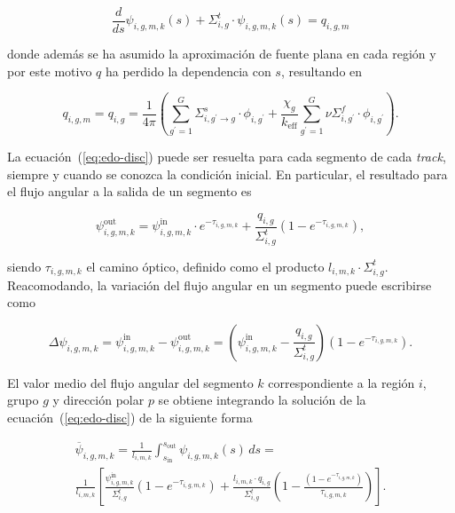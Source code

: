 \documentclass[11pt]{article}
\begin{document}
\begin{equation} \label{eq:edo-disc}
 \frac{d}{ds}\psi_{i,g,m,k} (s)
 + \Sigma^t_{i,g} \cdot \psi_{i,g,m,k} (s) = 
 q_{i,g,m}
\end{equation}

\noindent
donde además se ha asumido la aproximación de fuente plana en cada región y por este motivo $q$ ha perdido la dependencia con $s$, resultando en

\begin{equation} \label{eq:fuente-isotropica}
 q_{i,g,m} = q_{i,g} = 
 \frac{1}{4\pi} \left(
 \sum_{g^\prime=1}^G \Sigma^s_{i,g^\prime \rightarrow g} \cdot \phi_{i,g^\prime}
 + \frac{\chi_g}{k_{\text{eff}}} \sum_{g^\prime=1}^G \nu\Sigma^f_{i,g^\prime} \cdot \phi_{i,g^\prime}
 \right).
\end{equation}

La ecuación~(\ref{eq:edo-disc}) puede ser resuelta para cada segmento de cada \emph{track}, siempre y cuando se conozca la condici\'on inicial. En particular, el resultado para el flujo angular a la salida de un segmento es

\begin{equation}
 \psi^{\text{out}}_{i,g,m,k} = \psi^{\text{in}}_{i,g,m,k} \cdot e^{-\tau_{i,g,m,k}}
 + \frac{q_{i,g}}{\Sigma^t_{i,g}} \left(1 - e^{-\tau_{i,g,m,k}} \right),
\end{equation}

\noindent
siendo $\tau_{i,g,m,k}$ el camino óptico, definido como el producto $l_{i,m,k} \cdot \Sigma^t_{i,g}$. Reacomodando, la variación del flujo angular en un segmento puede escribirse como

\begin{equation} \label{eq:delta-psi}
 \Delta \psi_{i,g,m,k} = 
 \psi^{\text{in}}_{i,g,m,k} - \psi^{\text{out}}_{i,g,m,k} = 
 \left( \psi^{\text{in}}_{i,g,m,k} - \frac{q_{i,g}}{\Sigma^t_{i,g}} \right) \left(1 - e^{-\tau_{i,g,m,k}} \right).
\end{equation}

El valor medio del flujo angular del segmento $k$ correspondiente a la región $i$, grupo $g$ y dirección polar $p$ se obtiene integrando la soluci\'on de la ecuación~(\ref{eq:edo-disc}) de la siguiente forma

\begin{multline}
 \overline{\psi}_{i,g,m,k} =
 \frac{1}{l_{i,m,k}} \int_{s_{\text{in}}}^{s_{\text{out}}} \psi_{i,g,m,k} (s) \, ds = \\
 \frac{1}{l_{i,m,k}} \left[ \frac{\psi^{\text{in}}_{i,g,m,k}}{\Sigma^t_{i,g}} \left(1 - e^{-\tau_{i,g,m,k}} \right) + \frac{l_{i,m,k} \cdot q_{i,g}}{\Sigma^t_{i,g}} \left( 1 - \frac{\left(1 - e^{-\tau_{i,g,m,k}} \right)}{\tau_{i,g,m,k}} \right) \right].
\end{multline}
\end{document}
